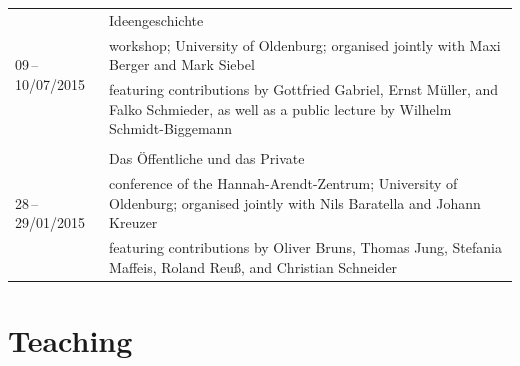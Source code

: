\documentclass[a4paper,10pt]{article}
\begin{document}
\begin{longtable}{p{2.5cm}p{11cm}}
\\
\multirow{3}{2.5cm}{\footnotesize{09\,--\,10/07/2015}} & Ideengeschichte\\
& \footnotesize{workshop; University of Oldenburg; organised jointly with Maxi Berger and Mark Siebel}\\
& \footnotesize{featuring contributions by Gottfried Gabriel, Ernst Müller, and Falko Schmieder, as well as a public lecture by Wilhelm Schmidt-Biggemann}\\
\\
\multirow{3}{2.5cm}{\footnotesize{28\,--\,29/01/2015}} & Das Öffentliche und das Private\\
& \footnotesize{conference of the Hannah-Arendt-Zentrum; University of Oldenburg; organised jointly with Nils Baratella and Johann Kreuzer}\\
& \footnotesize{featuring contributions by Oliver Bruns, Thomas Jung, Stefania Maffeis, Roland Reuß, and Christian Schneider}\\
\end{longtable}


\clearpage
\section{Teaching}


\end{document}
